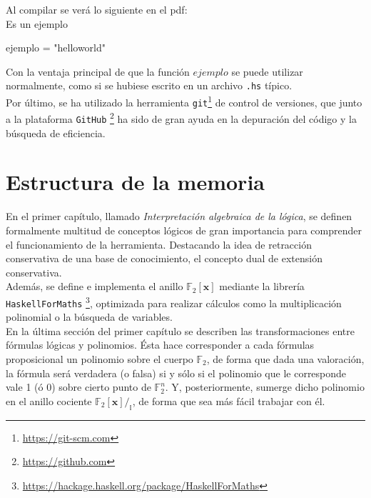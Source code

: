 Al compilar se verá lo siguiente en el pdf:\\

Es un ejemplo
\begin{code}
ejemplo = "helloworld"
\end{code}

\vspace{0.4cm}
Con la ventaja principal de que la función $ejemplo$ se puede utilizar normalmente, como si se hubiese escrito en un archivo \texttt{.hs} típico.\\

Por último, se ha utilizado la herramienta \texttt{git}\footnote{\url{https://git-scm.com}} de control de versiones, que junto a la plataforma \texttt{GitHub} \footnote{\url{https://github.com}} ha sido de gran ayuda en la depuración del código y la búsqueda de eficiencia.

\section*{Estructura de la memoria}


En el primer capítulo, llamado \textit{Interpretación algebraica de la lógica}, se definen formalmente multitud de conceptos lógicos de gran importancia para comprender el funcionamiento de la herramienta. Destacando la idea de retracción conservativa de una base de conocimiento, el concepto dual de extensión conservativa.\\ 

Además, se define e implementa el anillo $\mathbb{F}_2[\textbf{x}]$ mediante la librería \\ \texttt{HaskellForMaths} \footnote{\url{https://hackage.haskell.org/package/HaskellForMaths}}, optimizada para realizar cálculos como la multiplicación polinomial o la búsqueda de variables.\\ 

En la última sección del primer capítulo se describen las transformaciones entre fórmulas lógicas y polinomios. Ésta hace corresponder a cada fórmulas proposicional un polinomio sobre el cuerpo $\mathbb{F}_2$, de forma que dada una valoración, la fórmula será verdadera (o falsa) si y sólo si el polinomio que le corresponde vale 1 (ó 0) sobre cierto punto de $\mathbb{F}_2^n$. Y, posteriormente, sumerge dicho polinomio en el anillo cociente $\mathbb{F}_2[\textbf{x}] /_{\mathbb{I}}$, de forma que sea más fácil trabajar con él.\\

